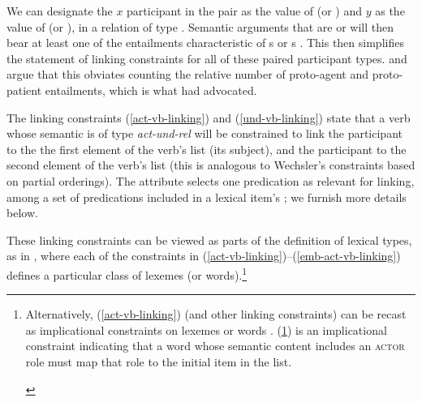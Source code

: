 \documentclass[output=paper
 	        ,biblatex
                ,babelshorthands
                ,newtxmath
                ,draftmode
                ,colorlinks, citecolor=brown
]{langscibook}
\begin{document}
\noindent
We can designate the $x$ participant in the pair as the value of  (or ) and
$y$ as the value of  (or ), in a relation of type .
Semantic arguments that are  or  will then bear at least one of the
entailments characteristic of s or s
\citep[72]{DavisandKoenig2000b}. This then simplifies the statement of linking constraints for all
of these paired participant types.  \citet{Davis1996} and \citet{KoenigandDavis2001} argue that this
obviates counting the relative number of proto-agent and proto-patient entailments, which is what
\citet{Dowty1991} had advocated.

The linking constraints (\ref{act-vb-linking}) and (\ref{und-vb-linking}) state that 
a verb whose semantic \content is of type \emph{act-und-rel} will be constrained to link the
 participant to the the first element of the verb's \argst list (its subject), and the
 participant to the second element of the verb's \argst list (this is analogous to
Wechsler's constraints based on partial orderings).
 The attribute  selects
one predication as relevant for linking, among a set of predications included in a lexical item's
; we furnish more details below. 

These linking constraints can be viewed as parts of the definition of lexical types, as in
\citet{Davis2001}, where each of the constraints in
(\ref{act-vb-linking})--(\ref{emb-act-vb-linking}) defines a particular class of lexemes (or
words).\footnote{Alternatively, (\ref{act-vb-linking}) (and other linking constraints) can be recast
  as implicational constraints on lexemes or words \citep{KoenigandDavis2003}.
  (\ref{act-vb-linking-alt}) is an implicational constraint indicating that a word whose semantic
  content includes an \textsc{actor} role must map that role to the initial item in the \argst list.

\begin{exe}
\ex\label{act-vb-linking-alt}
 \impl {}
\end{exe} 
}   

\begin{exe}
	\ex\label{act-vb-linking}
\end{exe}
\end{document}
